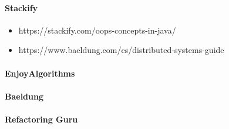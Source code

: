\documentclass{article}
\begin{document}
    \paragraph{Stackify}
        \begin{itemize}
            \item https://stackify.com/oops-concepts-in-java/
            \item https://www.baeldung.com/cs/distributed-systems-guide
        \end{itemize} 
    \paragraph{EnjoyAlgorithms}
    \paragraph{Baeldung}
    \paragraph{Refactoring Guru}
            
            
            
\end{document}
